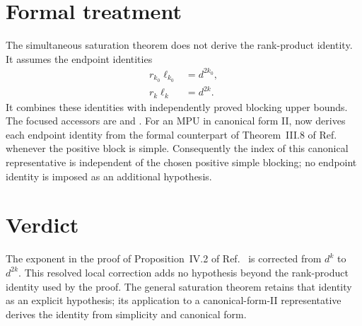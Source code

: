 \documentclass{article}
\begin{document}
\section{Formal treatment}

The simultaneous saturation theorem
 does not derive the
rank-product identity. It assumes the endpoint identities
\begin{align}
    r_{k_0}\ell_{k_0}
        &=d^{2k_0},
    \label{eq:mpu_blocking_rank_product_exponent_initial_endpoint_identity}\\
    r_k\ell_k
        &=d^{2k}.
    \label{eq:mpu_blocking_rank_product_exponent_final_endpoint_identity}
\end{align}
It combines these identities with independently proved blocking upper bounds.
The focused accessors are
 and
.
For an MPU in canonical form II,
now derives each endpoint identity from the formal counterpart of
Theorem~III.8 of Ref.~\cite{Cirac2017MPU} whenever the positive block is
simple. Consequently the index of this canonical representative is
independent of the chosen positive simple blocking; no endpoint identity
is imposed as an additional hypothesis.

\section{Verdict}

The exponent in the proof of Proposition~IV.2 of
Ref.~\cite{Cirac2017MPU} is corrected from $d^k$ to $d^{2k}$. This resolved
local correction adds no hypothesis beyond the rank-product identity used by
the proof. The general saturation theorem retains that identity as an explicit
hypothesis; its application to a canonical-form-II representative derives
the identity from simplicity and canonical form.



\end{document}
